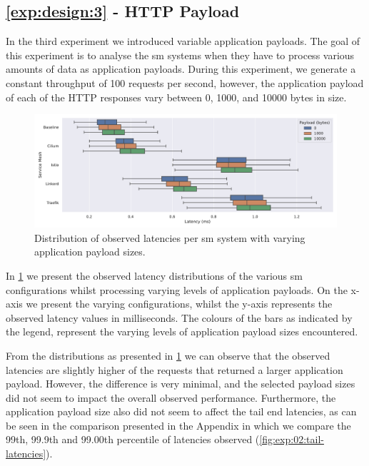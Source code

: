 \subsection{\ref{exp:design:3} - HTTP Payload}
\label{sec:experiments:results:per-experiment:03}

In the third experiment we introduced variable application payloads. The goal of this experiment is to analyse the \gls{sm} systems when they have to process various amounts of data as application payloads. During this experiment, we generate a constant throughput of 100 requests per second, however, the application payload of each of the HTTP responses vary between 0, 1000, and 10000 bytes in size. 


\begin{figure}[ht]
    \centering
    
    \includegraphics[width=\textwidth]{5_experimental_evaluation/figures/exp-03-latencies-all.pdf}

   \caption[Distribution of observed latencies per \gls{sm} system with varying application payload sizes]{Distribution of observed latencies per \gls{sm} system with varying application payload sizes.}
    
    \label{fig:exp:result:03:latency}
\end{figure}

In \cref{fig:exp:result:03:latency} we present the observed latency distributions of the various \gls{sm} configurations whilst processing varying levels of application payloads. On the x-axis we present the varying configurations, whilst the y-axis represents the observed latency values in milliseconds. The colours of the bars as indicated by the legend, represent the varying levels of application payload sizes encountered.

From the distributions as presented in \cref{fig:exp:result:03:latency} we can observe that the observed latencies are slightly higher of the requests that returned a larger application payload. However, the difference is very minimal, and the selected payload sizes did not seem to impact the overall observed performance. Furthermore, the application payload size also did not seem to affect the tail end latencies, as can be seen in the comparison presented in the Appendix in which we compare the 99th, 99.9th and 99.00th percentile of latencies observed (\cref{fig:exp:02:tail-latencies}).



